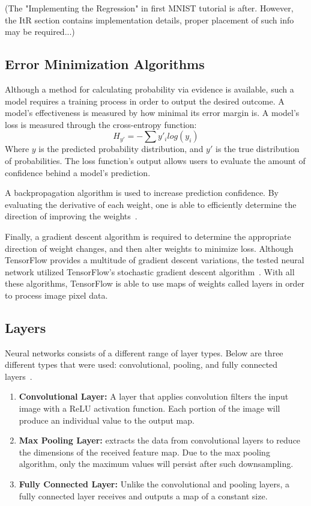 \documentclass[11pt]{article}
\begin{document}
(The "Implementing the Regression" in first MNIST tutorial is after. However, the ItR section contains implementation details, proper placement of such info may be required...)


\subsection{Error Minimization Algorithms}
Although a method for calculating probability via evidence is available, such a model requires a training process in order to output the desired outcome.  A model's effectiveness is measured by how minimal its error margin is.  A model's loss is measured through the cross-entropy function:
\begin{equation}
    H_{y'} = - \sum y'_{i} log(y_{i})
\end{equation}
Where $y$ is the predicted probability distribution, and $y'$ is the true distribution of probabilities.  The loss function's output allows users to evaluate the amount of confidence behind a model's prediction.  

A backpropagation algorithm is used to increase prediction confidence.  By evaluating the derivative of each weight, one is able to efficiently determine the direction of improving the weights~\cite{YannLecunBottouOrrMuller98}.

Finally, a gradient descent algorithm is required to determine the appropriate direction of weight changes, and then alter weights to minimize loss.  Although TensorFlow provides a multitude of gradient descent variations, the tested neural network utilized TensorFlow's stochastic gradient descent algorithm~\cite{aGuideToLayers17}.  With all these algorithms, TensorFlow is able to use maps of weights called layers in order to process image pixel data. 


\subsection{Layers}
Neural networks consists of a different range of layer types.  Below are three different types that were used: convolutional, pooling, and fully connected layers~\cite{aGuideToLayers17}.
\begin{enumerate}
  \item \textbf{Convolutional Layer:} A layer that applies convolution filters the input image with a ReLU activation function.  Each portion of the image will produce an individual value to the output map.
  \item \textbf{Max Pooling Layer:} extracts the data from convolutional layers to reduce the dimensions of the received feature map.  Due to the max pooling algorithm, only the maximum values will persist after such downsampling.  
  \item \textbf{Fully Connected Layer:} Unlike the convolutional and pooling layers, a fully connected layer receives and outputs a map of a constant size.
\end{enumerate}
\end{document}
